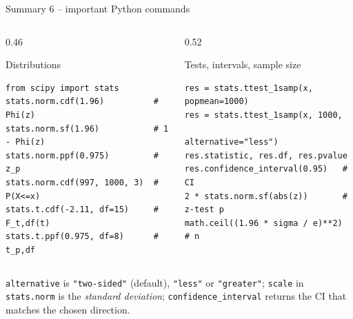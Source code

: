 \documentclass[aspectratio=169,11pt]{beamer}
\begin{document}
\begin{frame}[fragile]{Summary 6 -- important Python commands}
  \begin{columns}[T]
    \begin{column}{0.46\textwidth}
      \begin{block}{Distributions}
\begin{lstlisting}
from scipy import stats
stats.norm.cdf(1.96)          # Phi(z)
stats.norm.sf(1.96)           # 1 - Phi(z)
stats.norm.ppf(0.975)         # z_p
stats.norm.cdf(997, 1000, 3)  # P(X<=x)
stats.t.cdf(-2.11, df=15)     # F_t,df(t)
stats.t.ppf(0.975, df=8)      # t_p,df
\end{lstlisting}
      \end{block}
    \end{column}
    \begin{column}{0.52\textwidth}
      \begin{block}{Tests, intervals, sample size}
\begin{lstlisting}
res = stats.ttest_1samp(x, popmean=1000)
res = stats.ttest_1samp(x, 1000,
                        alternative="less")
res.statistic, res.df, res.pvalue
res.confidence_interval(0.95)   # CI
2 * stats.norm.sf(abs(z))       # z-test p
math.ceil((1.96 * sigma / e)**2)  # n
\end{lstlisting}
      \end{block}
    \end{column}
  \end{columns}
  \footnotesize \texttt{alternative} is \texttt{"two-sided"} (default),
  \texttt{"less"} or \texttt{"greater"}; \texttt{scale} in \texttt{stats.norm}
  is the \emph{standard deviation}; \texttt{confidence\_interval} returns the
  CI that matches the chosen direction.
\end{frame}
\end{document}
